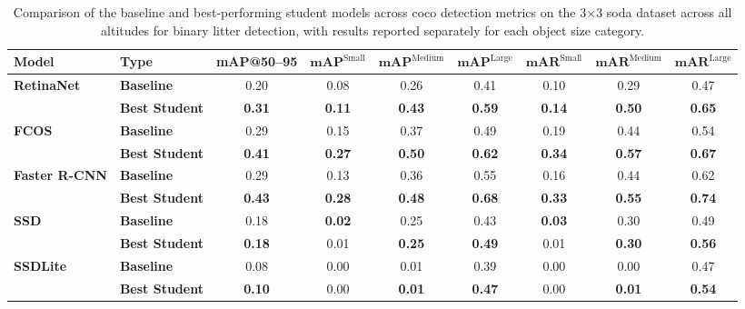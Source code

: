 \begin{table}[htbp]
\centering
\renewcommand{\arraystretch}{1.35} %
\begin{adjustbox}{width=\textwidth}
\begin{tabular}{llccccccc}
\hline
\textbf{Model} & \textbf{Type} & \textbf{mAP@50--95} & \(\mathbf{mAP}^{\text{Small}}\) & \(\mathbf{mAP}^{\text{Medium}}\) & \(\mathbf{mAP}^{\text{Large}}\) & \(\mathbf{mAR}^{\text{Small}}\) & \(\mathbf{mAR}^{\text{Medium}}\) & \(\mathbf{mAR}^{\text{Large}}\) \\ \hline
\multirow{2}{*}{\textbf{RetinaNet}} 
 & \textbf{Baseline}      & 0.20 & 0.08 & 0.26 & 0.41 & 0.10 & 0.29 & 0.47 \\
 & \textbf{Best Student}  & \textbf{0.31} & \textbf{0.11} & \textbf{0.43} & \textbf{0.59} & \textbf{0.14} & \textbf{0.50} & \textbf{0.65} \\ \hline
\multirow{2}{*}{\textbf{FCOS}} 
 & \textbf{Baseline}      & 0.29 & 0.15 & 0.37 & 0.49 & 0.19 & 0.44 & 0.54 \\
 & \textbf{Best Student}  & \textbf{0.41} & \textbf{0.27} & \textbf{0.50} & \textbf{0.62} & \textbf{0.34} & \textbf{0.57} & \textbf{0.67} \\ \hline
\multirow{2}{*}{\textbf{Faster R-CNN}} 
 & \textbf{Baseline}      & 0.29 & 0.13 & 0.36 & 0.55 & 0.16 & 0.44 & 0.62 \\
 & \textbf{Best Student}  & \textbf{0.43} & \textbf{0.28} & \textbf{0.48} & \textbf{0.68} & \textbf{0.33} & \textbf{0.55} & \textbf{0.74} \\ \hline
\multirow{2}{*}{\textbf{SSD}} 
 & \textbf{Baseline}      & 0.18 & \textbf{0.02} & 0.25 & 0.43 & \textbf{0.03} & 0.30 & 0.49 \\
 & \textbf{Best Student}  & \textbf{0.18} & 0.01 & \textbf{0.25} & \textbf{0.49} & 0.01 & \textbf{0.30} & \textbf{0.56} \\ \hline
\multirow{2}{*}{\textbf{SSDLite}} 
 & \textbf{Baseline}      & 0.08 & 0.00 & 0.01 & 0.39 & 0.00 & 0.00 & 0.47 \\
 & \textbf{Best Student}  & \textbf{0.10} & 0.00 & \textbf{0.01} & \textbf{0.47} & 0.00 & \textbf{0.01} & \textbf{0.54} \\ \hline
\end{tabular}
\end{adjustbox}
\caption{Comparison of the baseline and best‐performing student models across \gls{coco} detection metrics on the 3$\times$3 \gls{soda} dataset across all altitudes for binary litter detection, with results reported separately for each object size category.}
\label{tab:soda_tiled_binary_object_sizes_split}
\end{table}

